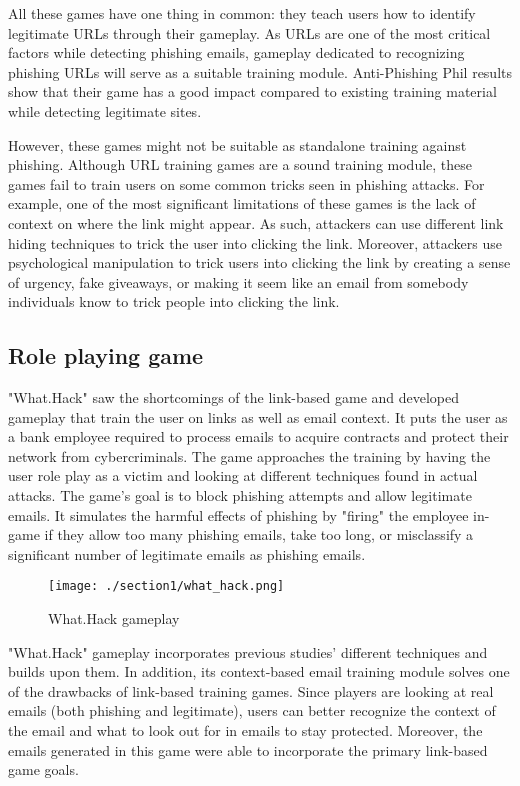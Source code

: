 All these games have one thing in common: they teach users how to identify legitimate URLs through their gameplay. As URLs are one of the most critical factors while detecting phishing emails, gameplay dedicated to recognizing phishing URLs will serve as a suitable training module. Anti-Phishing Phil results show that their game has a good impact compared to existing training material while detecting legitimate sites.

However, these games might not be suitable as standalone training against phishing. Although URL training games are a sound training module, these games fail to train users on some common tricks seen in phishing attacks. For example, one of the most significant limitations of these games is the lack of context on where the link might appear. As such, attackers can use different link hiding techniques to trick the user into clicking the link. Moreover, attackers use psychological manipulation to trick users into clicking the link by creating a sense of urgency, fake giveaways, or making it seem like an email from somebody individuals know to trick people into clicking the link.

\subsection{Role playing game}
"What.Hack" \cite{what_hack} saw the shortcomings of the link-based game and developed gameplay that train the user on links as well as email context. It puts the user as a bank employee required to process emails to acquire contracts and protect their network from cybercriminals. The game approaches the training by having the user role play as a victim and looking at different techniques found in actual attacks. The game's goal is to block phishing attempts and allow legitimate emails. It simulates the harmful effects of phishing by "firing" the employee in-game if they allow too many phishing emails, take too long, or misclassify a significant number of legitimate emails as phishing emails.

\begin{figure}[h]
    \centering
    \texttt{[image: ./section1/what\_hack.png]}
    \caption{What.Hack gameplay}
\end{figure}

"What.Hack" gameplay incorporates previous studies' different techniques and builds upon them. In addition, its context-based email training module solves one of the drawbacks of link-based training games. Since players are looking at real emails (both phishing and legitimate), users can better recognize the context of the email and what to look out for in emails to stay protected. Moreover, the emails generated in this game were able to incorporate the primary link-based game goals.

